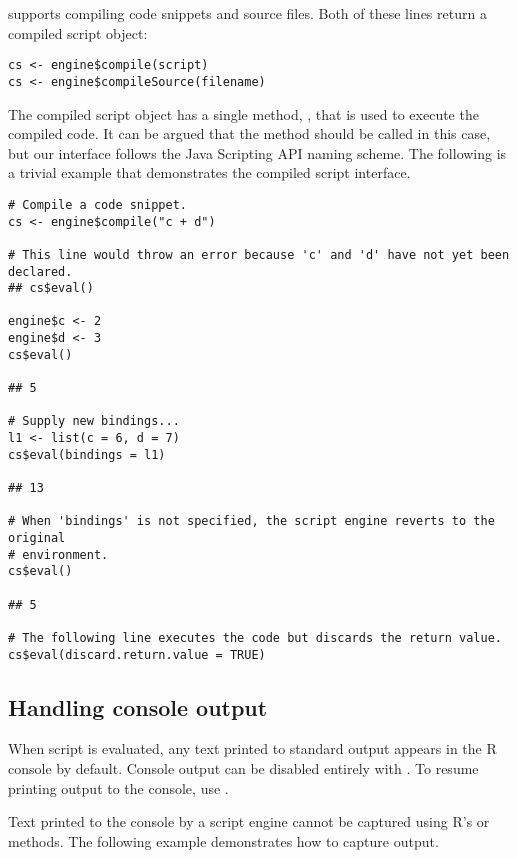  supports compiling code snippets and source files. Both of these lines return a compiled script object:

\begin{verbatim}
cs <- engine$compile(script)
cs <- engine$compileSource(filename)
\end{verbatim}

The compiled script object has a single method, , that is used to execute the compiled code. It can be argued that the method should be called  in this case, but our interface follows the Java Scripting API naming scheme. The following is a trivial example that demonstrates the compiled script interface.

\begin{verbatim}
# Compile a code snippet.
cs <- engine$compile("c + d")

# This line would throw an error because 'c' and 'd' have not yet been declared.
## cs$eval()

engine$c <- 2
engine$d <- 3
cs$eval()

## 5

# Supply new bindings...
l1 <- list(c = 6, d = 7)
cs$eval(bindings = l1)

## 13

# When 'bindings' is not specified, the script engine reverts to the original
# environment.
cs$eval()

## 5

# The following line executes the code but discards the return value.
cs$eval(discard.return.value = TRUE)
\end{verbatim}

\subsection{Handling console output}

When script is evaluated, any text printed to standard output appears in the R console by default. Console output can be disabled entirely with . To resume printing output to the console, use .

Text printed to the console by a script engine cannot be captured using R's  or  methods. The following example demonstrates how to capture output.

